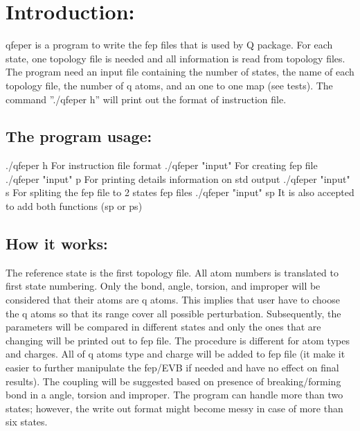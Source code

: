 \documentclass{article}
\author{Masoud Kazemi}
\begin{document}
\section*{Introduction:}
qfeper is a program to write the fep files that is used by Q package. For each
state, one topology file is needed and all information is read from topology files.
The program need an input file containing the number of states, the name of
each topology file, the number of q atoms, and an one to one map (see tests).
The command ”./qfeper h” will print out the format of instruction file.
\subsection*{The program usage:}
    ./qfeper \hspace{0.5cm} h                  \hspace{1.7cm}  For instruction file format\newline
    ./qfeper \hspace{0.5cm} "input"            \hspace{.7cm}  For creating fep file\newline
    ./qfeper \hspace{0.5cm} "input" p          \hspace{.4cm} For printing details information on std output\newline 
    ./qfeper \hspace{0.5cm} "input" s          \hspace{.5cm} For spliting the fep file to 2 states fep files\newline
    ./qfeper \hspace{0.5cm} "input" sp         \hspace{.3cm} It is also accepted to add both functions (sp or ps)\newline

\subsection*{How it works:}
The reference state is the first topology file. All atom numbers is translated
to first state numbering. Only the bond, angle, torsion, and improper will be
considered that their atoms are q atoms. This implies that user have to choose
the q atoms so that its range cover all possible perturbation. Subsequently,
the parameters will be compared in different states and only the ones that
are changing will be printed out to fep file. The procedure is different for
atom types and charges. All of q atoms type and charge will be added to fep
file (it make it easier to further manipulate the fep/EVB if needed and have
no effect on final results). The coupling will be suggested based on presence
of breaking/forming bond in a angle, torsion and improper. The program can
handle more than two states; however, the write out format might become messy
in case of more than six states.
\end{document}
